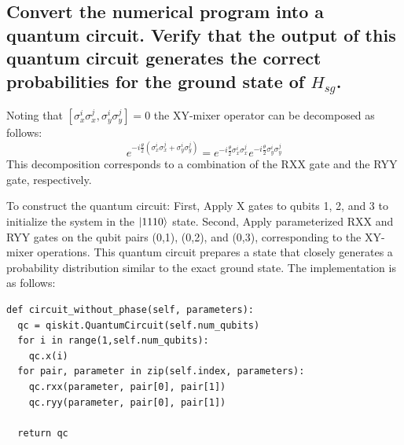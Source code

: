 \documentclass[a4paper, 11pt]{article}
\begin{document}
\subsection*{Convert the numerical program into a quantum circuit. Verify that the output of this quantum circuit generates the correct probabilities for the ground state of $H_{sg}$.}
Noting that $\left[\sigma_x^{i}\sigma_x^{j}, \sigma_y^{i}\sigma_y^{j} \right] = 0$ the XY-mixer operator can be decomposed as follows:
\begin{equation}
  e^{-i\frac{\theta}{2} \left( \sigma_x^{i}\sigma_x^{j} + \sigma_y^{i}\sigma_y^{j}\right)} = e^{-i\frac{\theta}{2}  \sigma_x^{i}\sigma_x^{j}} e^{-i\frac{\theta}{2}  \sigma_y^{i}\sigma_y^{j}}
\end{equation}
This decomposition corresponds to a combination of the RXX gate and the RYY gate, respectively.

To construct the quantum circuit:
First, Apply X gates to qubits 1, 2, and 3 to initialize the system in the $\ket{1110}$ state. Second,
Apply parameterized RXX and RYY gates on the qubit pairs (0,1), (0,2), and (0,3), corresponding to the XY-mixer operations.
This quantum circuit prepares a state that closely generates a probability distribution similar to the exact ground state. The implementation is as follows:
\begin{verbatim}
def circuit_without_phase(self, parameters):
  qc = qiskit.QuantumCircuit(self.num_qubits)
  for i in range(1,self.num_qubits):
    qc.x(i)
  for pair, parameter in zip(self.index, parameters):
    qc.rxx(parameter, pair[0], pair[1])
    qc.ryy(parameter, pair[0], pair[1])

  return qc
\end{verbatim}
\end{document}

